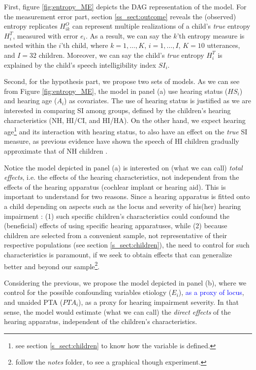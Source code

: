 First, figure \ref{fig:entropy_ME} depicts the DAG representation of the model. For the measurement error part, section \ref{ss_sect:outcome} reveals the (observed) entropy replicates $H^{O}_{ik}$ can represent multiple realizations of a child's \textit{true} entropy $H^{T}_{i}$, measured with error $e_i$. As a result, we can say the $k$'th entropy measure is nested within the $i$'th child, where $k=1, \dots, K$, $i=1, \dots, I$, $K = 10$ utterances, and $I = 32$ children. Moreover, we can say the child's \textit{true} entropy $H^{T}_{i}$ is explained by the child's speech intelligibility index $SI_{i}$.

Second, for the hypothesis part, we propose two sets of models. As we can see from Figure \ref{fig:entropy_ME}, the model in panel (a) use hearing status ($HS_{i}$) and hearing age ($A_{i}$) as covariates. The use of hearing status is justified as we are interested in comparing SI among groups, defined by the children's hearing characteristics (NH, HI/CI, and HI/HA). On the other hand, we expect hearing age\footnote{see section \ref{s_sect:children} to know how the variable is defined.} and its interaction with hearing status, to also have an effect on the \textit{true} SI measure, as previous evidence have shown the speech of HI children gradually approximate that of NH children \citep{Boonen_et_al_2019}.

Notice the model depicted in panel (a) is interested on (what we can call) \textit{total effects}, i.e. the effects of the hearing characteristics, not independent from the effects of the hearing apparatus (cochlear implant or hearing aid). This is important to understand for two reasons. Since a hearing apparatus is fitted onto a child depending on aspects such as the locus and severity of his(her) hearing impairment \citep{Korver_et_al_2017}: (1) such specific children's characteristics could confound the (beneficial) effects of using specific hearing apparatuses, while (2) because children are selected from a convenient sample, not representative of their respective populations (see section \ref{s_sect:children}), the need to control for such characteristics is paramount, if we seek to obtain effects that can generalize better and beyond our sample\footnote{follow the \textit{notes} folder, to see a graphical though experiment.}.

Considering the previous, we propose the model depicted in panel (b), where we control for the possible confounding variables etiology ($E_{i}$), \textcolor{blue}{as a proxy of locus}, and unaided PTA ($PTA_{i}$), as a proxy for hearing impairment severity. In that sense, the model would estimate (what we can call) the \textit{direct effects} of the hearing apparatus, independent of the children's characteristics.

